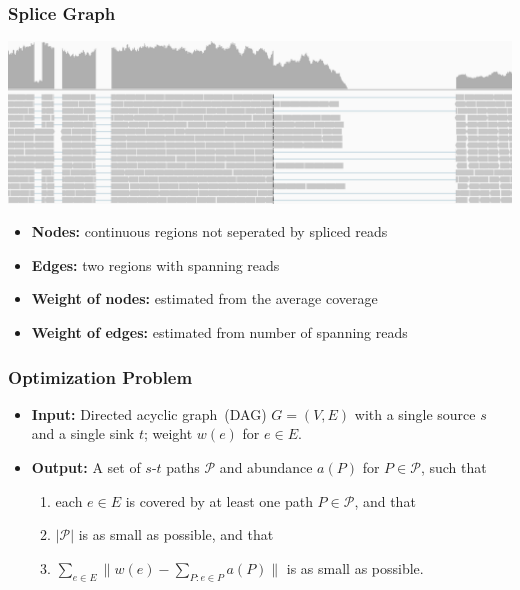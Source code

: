 \frame
{
	\frametitle{Splice Graph}
	\includegraphics[width=\textwidth]{figures/reference.pdf}
	\vspace{0.2cm}
	
	\vspace{-0.4cm}
	
	\vspace{0.2cm}
	\begin{itemize}
	\item<3-> {\bf Nodes:} continuous regions not seperated by spliced reads
	\item<3-> {\bf Edges:} two regions with spanning reads
	\item<4-> {\bf Weight of nodes:} estimated from the average coverage
	\item<4-> {\bf Weight of edges:} estimated from number of spanning reads
	\end{itemize}
}

\frame
{
	\frametitle{Optimization Problem}

	\begin{itemize}
	\item {\bf Input:} Directed acyclic graph~(DAG) $G=(V,E)$ with a single source $s$ and a single sink $t$;
		weight $w(e)$ for $e\in E$.

	\vspace{1.0cm}
	
	\vspace{1.0cm}

	\vspace{0.5cm}

	\item<2-> {\bf Output:} A set of $s$-$t$ paths $\mathcal{P}$ and abundance $a(P)$ for $P\in\mathcal{P}$, such that
		\begin{enumerate}
		\vspace{0.1cm}
		\item each $e\in E$ is covered by at least one path $P\in\mathcal{P}$, and that
		\vspace{0.1cm}
		\item $|\mathcal{P}|$ is as small as possible, and that
		\vspace{0.1cm}
		\item $\sum_{e\in E} \|w(e) - \sum_{P:e\in P} a(P)\|$ is as small as possible.
		\end{enumerate}
	\end{itemize}

}

